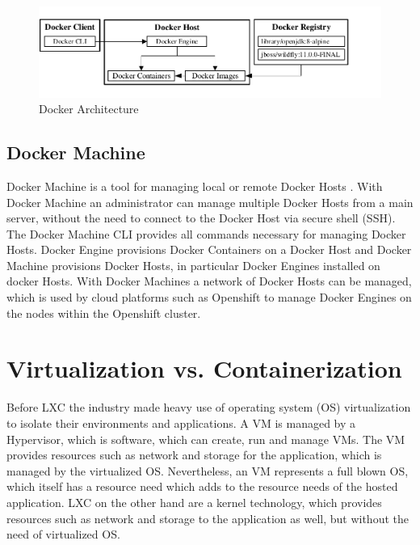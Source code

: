 \begin{figure}[htbp]
	\centering
	\includegraphics[scale=0.9]{images/docker-architecture.pdf}
	\caption{Docker Architecture}
	\label{fig:docker-architecture}
\end{figure} 

\subsection{Docker Machine}
\label{sec:docker-machine}
Docker Machine is a tool for managing local or remote Docker Hosts \cite{DockerMachine2018}. With Docker Machine an administrator can manage multiple Docker Hosts from a main server, without the need to connect to the Docker Host via secure shell (SSH). The Docker Machine CLI provides all commands necessary for managing Docker Hosts. Docker Engine provisions Docker Containers on a Docker Host and Docker Machine provisions Docker Hosts, in particular Docker Engines installed on docker Hosts. With Docker Machines a network of Docker Hosts can be managed, which is used by cloud platforms such as Openshift to manage Docker Engines on the nodes within the Openshift cluster.  

\section{Virtualization vs. Containerization}
\label{sec:docker-virtualization-vs-containerization}
Before LXC the industry made heavy use of operating system (OS) virtualization to isolate their environments and applications. A VM is managed by a Hypervisor, which is software, which can create, run and manage VMs. The VM provides resources such as network and storage for the application, which is managed by the virtualized OS. Nevertheless, an VM represents a full blown OS, which itself has a resource need which adds to the resource needs of the hosted application. LXC on the other hand are a kernel technology, which provides resources such as network and storage to the application as well, but without the need of virtualized OS.

